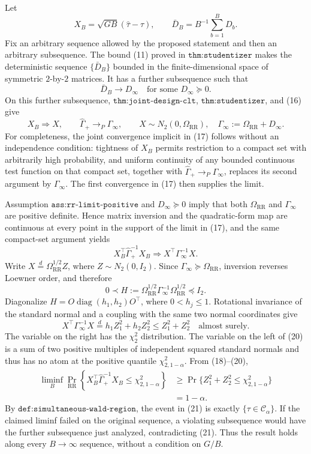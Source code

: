 Let
\[
 X_B=\sqrt{GB}(\widehat\tau-\tau),
 \qquad
 \bar D_B=B^{-1}\sum_{b=1}^BD_b.
\]
Fix an arbitrary sequence allowed by the proposed statement and then an arbitrary subsequence.  The bound (11) proved in \(\texttt{thm:studentizer}\) makes the deterministic sequence \(\{\bar D_B\}\) bounded in the finite-dimensional space of symmetric \(2\)-by-\(2\) matrices.  It has a further subsequence such that
\[
 \bar D_B\longrightarrow D_\infty
 \quad\text{for some }D_\infty\succeq0.                  \tag{16}
\]
On this further subsequence, \(\texttt{thm:joint-design-clt}\), \(\texttt{thm:studentizer}\), and (16) give
\[
 X_B\Rightarrow X,
 \qquad
 \widehat\Gamma_+\longrightarrow_P\Gamma_\infty,
 \qquad
 X\sim N_2(0,\Omega_{\mathrm{RR}}),
 \quad
 \Gamma_\infty:=\Omega_{\mathrm{RR}}+D_\infty.           \tag{17}
\]
For completeness, the joint convergence implicit in (17) follows without an independence condition: tightness of \(X_B\) permits restriction to a compact set with arbitrarily high probability, and uniform continuity of any bounded continuous test function on that compact set, together with \(\widehat\Gamma_+\to_P\Gamma_\infty\), replaces its second argument by \(\Gamma_\infty\).  The first convergence in (17) then supplies the limit.

Assumption \(\texttt{ass:rr-limit-positive}\) and \(D_\infty\succeq0\) imply that both \(\Omega_{\mathrm{RR}}\) and \(\Gamma_\infty\) are positive definite.  Hence matrix inversion and the quadratic-form map are continuous at every point in the support of the limit in (17), and the same compact-set argument yields
\[
 X_B^\top\widehat\Gamma_+^{-1}X_B
 \Rightarrow X^\top\Gamma_\infty^{-1}X.                  \tag{18}
\]
Write \(X\stackrel d=\Omega_{\mathrm{RR}}^{1/2}Z\), where \(Z\sim N_2(0,I_2)\).  Since \(\Gamma_\infty\succeq\Omega_{\mathrm{RR}}\), inversion reverses Loewner order, and therefore
\[
 0\prec
 H:=\Omega_{\mathrm{RR}}^{1/2}
       \Gamma_\infty^{-1}
       \Omega_{\mathrm{RR}}^{1/2}
 \preceq I_2.                                               \tag{19}
\]
Diagonalize \(H=O\operatorname{diag}(h_1,h_2)O^\top\), where \(0<h_j\le1\).  Rotational invariance of the standard normal and a coupling with the same two normal coordinates give
\[
 X^\top\Gamma_\infty^{-1}X
 \stackrel d=h_1Z_1^2+h_2Z_2^2
 \le Z_1^2+Z_2^2
 \quad\text{almost surely}.                                \tag{20}
\]
The variable on the right has the \(\chi^2_2\) distribution.  The variable on the left of (20) is a sum of two positive multiples of independent squared standard normals and thus has no atom at the positive quantile \(\chi^2_{2,1-\alpha}\).  From (18)--(20),
\[
 \begin{aligned}
 \liminf_B\Pr_{\mathrm{RR}}\!\left\{
  X_B^\top\widehat\Gamma_+^{-1}X_B
  \le\chi^2_{2,1-\alpha}\right\}
 &\ge
 \Pr\{Z_1^2+Z_2^2\le\chi^2_{2,1-\alpha}\}\\
 &=1-\alpha.                                                \tag{21}
 \end{aligned}
\]
By \(\texttt{def:simultaneous-wald-region}\), the event in (21) is exactly \(\{\tau\in\mathcal C_\alpha\}\).  If the claimed liminf failed on the original sequence, a violating subsequence would have the further subsequence just analyzed, contradicting (21).  Thus the result holds along every \(B\to\infty\) sequence, without a condition on \(G/B\).